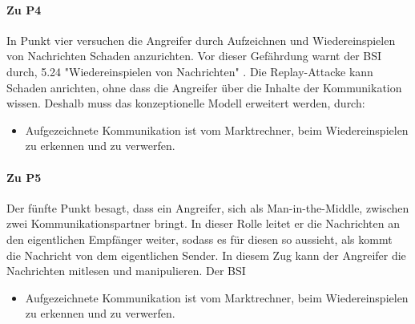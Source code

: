 \documentclass[11pt,a4paper]{report}
\begin{document}
\paragraph{Zu P4} In Punkt vier versuchen die Angreifer durch Aufzeichnen und Wiedereinspielen von Nachrichten Schaden anzurichten. Vor dieser Gefährdung warnt der BSI durch, 5.24 "Wiedereinspielen von Nachrichten" \cite{bsi_g5024}. Die Replay-Attacke kann Schaden anrichten, ohne dass die Angreifer über die Inhalte der Kommunikation wissen. Deshalb muss das konzeptionelle Modell erweitert werden, durch:

\begin{itemize}[leftmargin=*]
\item Aufgezeichnete Kommunikation ist vom Marktrechner, beim Wiedereinspielen zu erkennen und zu verwerfen.
\end{itemize}

\paragraph{Zu P5} Der fünfte Punkt besagt, dass ein Angreifer, sich als Man-in-the-Middle, zwischen zwei Kommunikationspartner bringt. In dieser Rolle leitet er die Nachrichten an den eigentlichen Empfänger weiter, sodass es für diesen so aussieht, als kommt die Nachricht von dem eigentlichen Sender. In diesem Zug kann der Angreifer die Nachrichten mitlesen und manipulieren. Der BSI \cite{bsi_g5048, bsi_g5078}

\begin{itemize}[leftmargin=*]
\item Aufgezeichnete Kommunikation ist vom Marktrechner, beim Wiedereinspielen zu erkennen und zu verwerfen.
\end{itemize}
\end{document}

